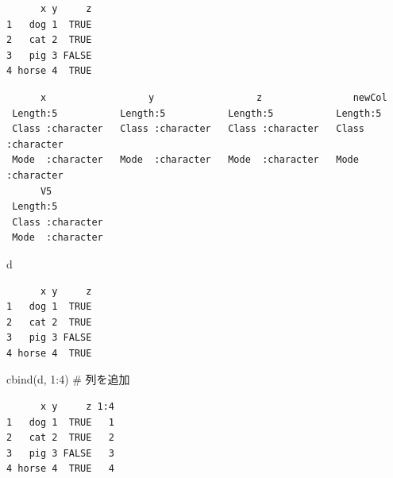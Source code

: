 \documentclass[
  letterpaper,
  DIV=11,
  numbers=noendperiod]{scrreprt}
\newenvironment{Shaded}{\begin{snugshade}}{\end{snugshade}}
\newcommand{\CommentTok}[1]{\textcolor[rgb]{0.37,0.37,0.37}{#1}}
\newcommand{\DecValTok}[1]{\textcolor[rgb]{0.68,0.00,0.00}{#1}}
\newcommand{\FunctionTok}[1]{\textcolor[rgb]{0.28,0.35,0.67}{#1}}
\newcommand{\NormalTok}[1]{\textcolor[rgb]{0.00,0.23,0.31}{#1}}
\newcommand{\OtherTok}[1]{\textcolor[rgb]{0.00,0.23,0.31}{#1}}
\newcommand{\SpecialCharTok}[1]{\textcolor[rgb]{0.37,0.37,0.37}{#1}}
\newcommand{\StringTok}[1]{\textcolor[rgb]{0.13,0.47,0.30}{#1}}
\begin{document}
\begin{verbatim}
      x y     z
1   dog 1  TRUE
2   cat 2  TRUE
3   pig 3 FALSE
4 horse 4  TRUE
\end{verbatim}

\begin{Shaded}
\end{Shaded}

\begin{verbatim}
      x                  y                  z                newCol         
 Length:5           Length:5           Length:5           Length:5          
 Class :character   Class :character   Class :character   Class :character  
 Mode  :character   Mode  :character   Mode  :character   Mode  :character  
      V5           
 Length:5          
 Class :character  
 Mode  :character  
\end{verbatim}

\begin{Shaded}
\begin{Highlighting}[]
\NormalTok{d}
\end{Highlighting}
\end{Shaded}

\begin{verbatim}
      x y     z
1   dog 1  TRUE
2   cat 2  TRUE
3   pig 3 FALSE
4 horse 4  TRUE
\end{verbatim}

\begin{Shaded}
\begin{Highlighting}[]
\FunctionTok{cbind}\NormalTok{(d, }\DecValTok{1}\SpecialCharTok{:}\DecValTok{4}\NormalTok{) }\CommentTok{\# 列を追加}
\end{Highlighting}
\end{Shaded}

\begin{verbatim}
      x y     z 1:4
1   dog 1  TRUE   1
2   cat 2  TRUE   2
3   pig 3 FALSE   3
4 horse 4  TRUE   4
\end{verbatim}
\end{document}
